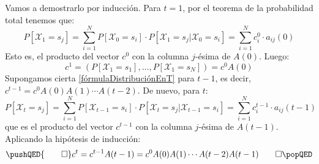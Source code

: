 \begin{proofs*}
Vamos a demostrarlo por inducción. Para $t=1$, por el teorema de la probabilidad total tenemos que:
\[P[\mathcal{X}_1=s_j]=\sum_{i=1}^N P[\mathcal{X}_0=s_i]\cdot P[\mathcal{X}_1=s_j|\mathcal{X}_0=s_i]=\sum_{i=1}^N  c_i^0\cdot a_{ij}(0)\]
Esto es, el producto del vector $c^0$ con la columna $j$-ésima de $A(0)$. Luego:
\[c^1=\left(P[\mathcal{X}_1=s_1],\dots,P[\mathcal{X}_1=s_N]\right)=c^0A(0)\]
Supongamos cierta \eqref{fórmulaDistribuciónEnT} para $t-1$, es decir, $c^{t-1}=c^0A(0)A(1)\cdots A(t-2)$. De nuevo, para $t$:
\[P[\mathcal{X}_t=s_j]=\sum_{i=1}^N P[\mathcal{X}_{t-1}=s_i]\cdot P[\mathcal{X}_t=s_j|\mathcal{X}_{t-1}=s_i]=\sum_{i=1}^N  c_i^{t-1}\cdot a_{ij}(t-1)\]
que es el producto del vector $c^{t-1}$ con la columna $j$-ésima de $A(t-1)$. Aplicando la hipótesis de inducción:
\[ \pushQED{\qed}
    c^t= c^{t-1}A(t-1) =c^0A(0)A(1)\cdots A(t-2)A(t-1)\qedhere
    \popQED\]
\end{proofs*}

